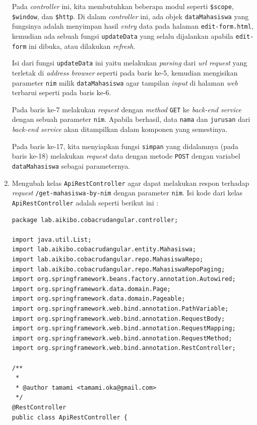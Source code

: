 \begin{enumerate}
	Pada \textit{controller} ini, kita membutuhkan beberapa modul seperti \texttt{\$scope}, \texttt{\$window}, dan \texttt{\$http}. Di dalam \textit{controller} ini, ada objek \texttt{dataMahasiswa} yang fungsinya adalah menyimpan hasil \textit{entry} data pada halaman \texttt{edit-form.html}, kemudian ada sebuah fungsi \texttt{updateData} yang selalu dijalankan apabila \texttt{edit-form} ini dibuka, atau dilakukan \textit{refresh}.
	
	Isi dari fungsi \texttt{updateData} ini yaitu melakukan \textit{parsing} dari \textit{url request} yang terletak di \textit{address browser} seperti pada baris ke-5, kemudian mengisikan parameter \texttt{nim} milik \texttt{dataMahasiswa} agar tampilan \textit{input} di halaman \textit{web} terbarui seperti pada baris ke-6.
	
	Pada baris ke-7 melakukan \textit{request} dengan \textit{method} \texttt{GET} ke \textit{back-end service} dengan sebuah parameter  \texttt{nim}. Apabila berhasil, data \texttt{nama} dan \texttt{jurusan} dari \textit{back-end service} akan ditampilkan dalam komponen yang semestinya.
	
	Pada baris ke-17, kita menyiapkan fungsi \texttt{simpan} yang didalamnya (pada baris ke-18) melakukan \textit{request} data dengan metode \texttt{POST} dengan variabel \texttt{dataMahasiswa} sebagai parameternya.
	
	\item Mengubah kelas \texttt{ApiRestController} agar dapat melakukan respon terhadap \textit{request} \texttt{/get-mahasiswa-by-nim} dengan parameter \texttt{nim}. Isi kode dari kelas \texttt{ApiRestController} adalah seperti berikut ini :
	
	\begin{lstlisting}
package lab.aikibo.cobacrudangular.controller;

import java.util.List;
import lab.aikibo.cobacrudangular.entity.Mahasiswa;
import lab.aikibo.cobacrudangular.repo.MahasiswaRepo;
import lab.aikibo.cobacrudangular.repo.MahasiswaRepoPaging;
import org.springframework.beans.factory.annotation.Autowired;
import org.springframework.data.domain.Page;
import org.springframework.data.domain.Pageable;
import org.springframework.web.bind.annotation.PathVariable;
import org.springframework.web.bind.annotation.RequestBody;
import org.springframework.web.bind.annotation.RequestMapping;
import org.springframework.web.bind.annotation.RequestMethod;
import org.springframework.web.bind.annotation.RestController;

/**
 *
 * @author tamami <tamami.oka@gmail.com>
 */
@RestController
public class ApiRestController {
    

\end{lstlisting}
\end{enumerate}
